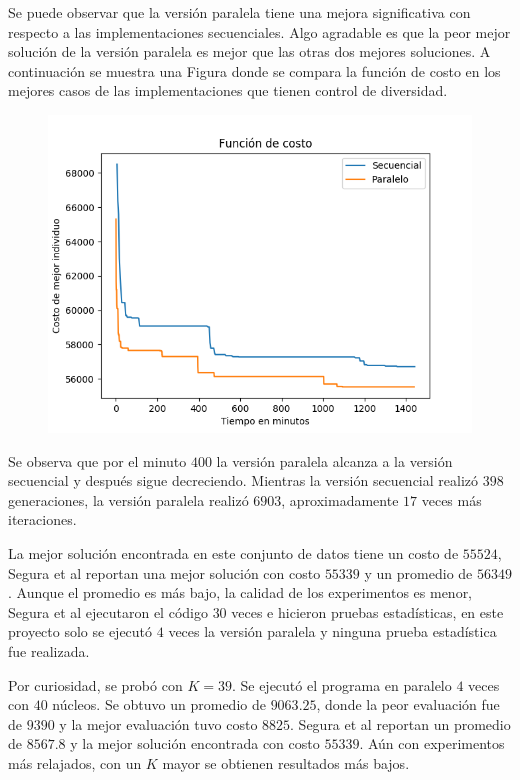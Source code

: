 \documentclass[10pt,a4paper]{article}
\begin{document}
\noindent Se puede observar que la versión paralela tiene una mejora significativa con respecto a las implementaciones secuenciales. Algo agradable es que la peor mejor solución de la versión paralela es mejor que las otras dos mejores soluciones. A continuación se muestra una Figura donde se compara la función de costo en los mejores casos de las implementaciones que tienen control de diversidad.

\begin{figure}[H]
\centering
\includegraphics[scale=0.65]{2.png} 
\end{figure}

\noindent Se observa que por el minuto $400$ la versión paralela alcanza a la versión secuencial y después sigue decreciendo. Mientras la versión secuencial realizó $398$ generaciones, la versión paralela realizó $6903$, aproximadamente $17$ veces más iteraciones. 

\noindent La mejor solución encontrada en este conjunto de datos tiene un costo de $55524$, Segura et al reportan una mejor solución con costo $55339$ y un promedio de $56349$. Aunque el promedio es más bajo, la calidad de los experimentos es menor, Segura et al ejecutaron el código $30$ veces e hicieron pruebas estadísticas, en este proyecto solo se ejecutó $4$ veces la versión paralela y ninguna prueba estadística fue realizada. 

\noindent Por curiosidad, se probó con $K = 39$. Se ejecutó el programa en paralelo $4$ veces con $40$ núcleos. Se obtuvo un promedio de $9063{.}25$, donde la peor evaluación fue de $9390$ y la mejor evaluación tuvo costo $8825$. Segura et al reportan un promedio de $8567.8$ y la mejor solución encontrada con costo $55339$. Aún con experimentos más relajados, con un $K$ mayor se obtienen resultados más bajos. 
\end{document}
